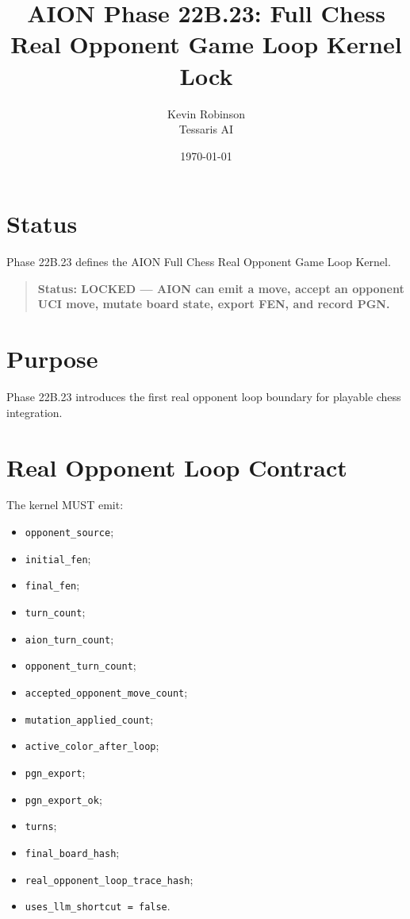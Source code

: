 \documentclass[11pt,a4paper]{article}
\title{\textbf{AION Phase 22B.23: Full Chess Real Opponent Game Loop Kernel Lock}}
\author{Kevin Robinson\\Tessaris AI}
\date{\today}
\begin{document}
\maketitle

\section{Status}

Phase 22B.23 defines the AION Full Chess Real Opponent Game Loop Kernel.

\begin{quote}
\textbf{Status: LOCKED --- AION can emit a move, accept an opponent UCI move, mutate board state, export FEN, and record PGN.}
\end{quote}

\section{Purpose}

Phase 22B.23 introduces the first real opponent loop boundary for playable chess integration.

\section{Real Opponent Loop Contract}

The kernel MUST emit:

\begin{itemize}
  \item \texttt{opponent\_source};
  \item \texttt{initial\_fen};
  \item \texttt{final\_fen};
  \item \texttt{turn\_count};
  \item \texttt{aion\_turn\_count};
  \item \texttt{opponent\_turn\_count};
  \item \texttt{accepted\_opponent\_move\_count};
  \item \texttt{mutation\_applied\_count};
  \item \texttt{active\_color\_after\_loop};
  \item \texttt{pgn\_export};
  \item \texttt{pgn\_export\_ok};
  \item \texttt{turns};
  \item \texttt{final\_board\_hash};
  \item \texttt{real\_opponent\_loop\_trace\_hash};
  \item \texttt{uses\_llm\_shortcut = false}.
\end{itemize}
\end{document}
